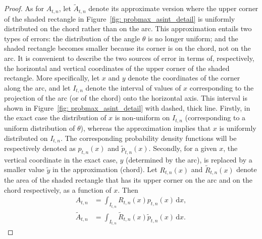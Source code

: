 \documentclass[12pt, a4paper]{article}
\newcommand{\diff}{\mathrm d}
\newcommand{\tiles}{t} %
\newcommand{\fdp}{p}
\newcommand{\intervx}{I}
\begin{document}
\begin{proof}
As for $A_{\tiles,n}$, let $\tilde A_{\tiles,n}$ denote its approximate version where the upper corner of the shaded rectangle in Figure~\ref{fig: probmax_asint_detail} is uniformly distributed on the chord rather than on the arc. This approximation entails two types of errors: the distribution of the angle $\theta$ is no longer uniform; and the shaded rectangle becomes smaller because its corner is on the chord, not on the arc. It is convenient to describe the two sources of error in terms of, respectively, the horizontal and vertical coordinates of the upper corner of the shaded rectangle. More specifically, let $x$ and $y$ denote the coordinates of the corner along the arc, and let $\intervx_{\tiles,n}$ denote the interval of values of $x$ corresponding to the projection of the arc (or of the chord) onto the horizontal axis. This interval is shown in Figure~\ref{fig: probmax_asint_detail} with dashed, thick line. Firstly, in the exact case the distribution of $x$ is non-uniform on $\intervx_{\tiles,n}$ (corresponding to a uniform distribution of $\theta$), whereas the approximation implies that $x$ is uniformly distributed on $\intervx_{\tiles,n}$. The corresponding probability density functions will be respectively denoted as $\fdp_{\tiles,n}(x)$ and $\tilde \fdp_{\tiles,n}(x)$. Secondly, for a given $x$, the vertical coordinate in the exact case, $y$ (determined by the arc), is replaced by a smaller value $\tilde y$ in the approximation (chord). Let $R_{\tiles,n}(x)$ and $\tilde R_{\tiles,n}(x)$ denote the area of the shaded rectangle that has its upper corner on the arc and on the chord respectively, as a function of $x$. Then
\begin{align}
\label{eq: A int R fdp x}
A_{\tiles,n} &= \int_{\intervx_{\tiles,n}} R_{\tiles,n}(x) \fdp_{\tiles,n}(x) \, \diff x, \\
\label{eq: tilde A int R fdp x}
\tilde A_{\tiles,n} &= \int_{\intervx_{\tiles,n}} \tilde R_{\tiles,n}(x) \tilde \fdp_{\tiles,n}(x) \, \diff x.
\end{align}


\end{proof}
\end{document}
